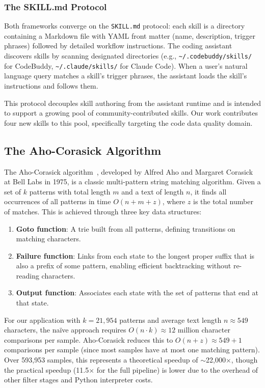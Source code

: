 \documentclass[acmlarge,nonacm,screen]{acmart}
\begin{document}
\subsubsection{The SKILL.md Protocol}

Both frameworks converge on the \texttt{SKILL.md} protocol: each skill is a directory containing a Markdown file with YAML front matter (name, description, trigger phrases) followed by detailed workflow instructions. The coding assistant discovers skills by scanning designated directories (e.g., \texttt{\textasciitilde/.codebuddy/skills/} for CodeBuddy, \texttt{\textasciitilde/.claude/skills/} for Claude Code). When a user's natural language query matches a skill's trigger phrases, the assistant loads the skill's instructions and follows them.

This protocol decouples skill authoring from the assistant runtime and is intended to support a growing pool of community-contributed skills. Our work contributes four new skills to this pool, specifically targeting the code data quality domain.

\subsection{The Aho-Corasick Algorithm}

The Aho-Corasick algorithm~\cite{aho1975efficient}, developed by Alfred Aho and Margaret Corasick at Bell Labs in 1975, is a classic multi-pattern string matching algorithm. Given a set of $k$ patterns with total length $m$ and a text of length $n$, it finds all occurrences of all patterns in time $O(n + m + z)$, where $z$ is the total number of matches. This is achieved through three key data structures:

\begin{enumerate}
    \item \textbf{Goto function}: A trie built from all patterns, defining transitions on matching characters.
    \item \textbf{Failure function}: Links from each state to the longest proper suffix that is also a prefix of some pattern, enabling efficient backtracking without re-reading characters.
    \item \textbf{Output function}: Associates each state with the set of patterns that end at that state.
\end{enumerate}

For our application with $k = 21{,}954$ patterns and average text length $n \approx 549$ characters, the na\"ive approach requires $O(n \cdot k) \approx 12$ million character comparisons per sample. Aho-Corasick reduces this to $O(n + z) \approx 549 + 1$ comparisons per sample (since most samples have at most one matching pattern). Over 593,953 samples, this represents a theoretical speedup of $\sim$22,000$\times$, though the practical speedup (11.5$\times$ for the full pipeline) is lower due to the overhead of other filter stages and Python interpreter costs.
\end{document}
